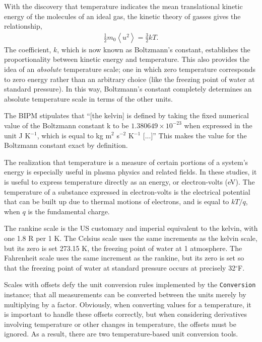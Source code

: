 With the discovery that temperature indicates the mean translational kinetic energy of the molecules of an ideal gas, the kinetic theory of gasses gives the relationship,
\begin{align}
\frac{1}{2} m_0 \left< u^2 \right> = \frac{3}{2} k T.
\end{align}
The coefficient, $k$, which is now known as Boltzmann's constant, establishes the proportionality between kinetic energy and temperature.  This also provides the idea of an \emph{absolute} temperature scale; one in which zero temperature corresponds to zero energy rather than an arbitrary choice (like the freezing point of water at standard pressure).  In this way, Boltzmann's constant completely determines an absolute temperature scale in terms of the other units.

The BIPM stipulates that ``[the kelvin] is defined by taking the fixed numerical value of the Boltzmann constant k to be $1.380 649 \times 10^{-23}$ when expressed in the unit J K$^{-1}$, which is equal to kg m$^2$ s$^{-2}$ K$^{-1}$ [...]''\cite{bipm}  This makes the value for the Boltzmann constant exact by definition.

The realization that temperature is a measure of certain portions of a system's energy is especially useful in plasma physics and related fields.  In these studies, it is useful to express temperature directly as an energy, or electron-volts (eV).  The temperature of a substance expressed in electron-volts is the electrical potential that can be built up due to thermal motions of electrons, and is equal to $kT / q$, when $q$ is the fundamental charge.

The rankine scale is the US customary and imperial equivalent to the kelvin, with one 1.8 R per 1 K.  The Celsius scale uses the same increments as the kelvin scale, but its zero is set 273.15 K, the freezing point of water at 1 atmosphere.  The Fahrenheit scale uses the same increment as the rankine, but its zero is set so that the freezing point of water at standard pressure occurs at precisely 32$^\circ$F.

Scales with offsets defy the unit conversion rules implemented by the \verb|Conversion| instance; that all measurements can be converted between the units merely by multiplying by a factor.  Obviously, when converting values for a temperature, it is important to handle these offsets correctly, but when considering derivatives involving temperature or other changes in temperature, the offsets must be ignored.  As a result, there are two temperature-based unit conversion tools.

